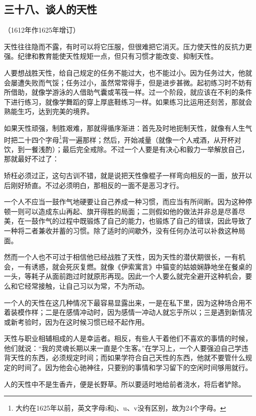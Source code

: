 \subsection*{三十八、谈人的天性}
\begin{center}
    （1612年作1625年增订）
\end{center}
\par 天性往往隐而不露，有时可以将它压服，但很难把它消灭。压力使天性的反抗力更强。纪律和教育能使天性规矩一点，但只有习惯才能改变、抑制天性。
\par 人要想战胜天性，给自己规定的任务不能过大，也不能过小。因为任务过大，他就会屡遭失败而气馁；任务过小，虽然常常得手，但是进步甚微。起初练习时不妨有所借助，就像学游泳的人借助气囊或苇筏一样。过一个阶段，就应该在不利的条件下进行练习，就像学舞蹈的穿上厚底鞋练习一样。如果练习比运用还刻苦，那就会熟能生巧，达到完美的境界。
\par 如果天性顽强，制胜艰难，那就得循序渐进：首先及时地扼制天性，就像有人生气时把二十四个字母\footnote{大约在1625年以前，英文字母i和j、u、v没有区别，故为24个字母。}背一遍那样；然后，开始减量（就像一个人戒酒，从开杯对饮，到一餐浅酌）；最后完全戒除。不过一个人要是有决心和毅力一举解放自己，那就最好不过了：
\par 矫枉必须过正，这句古训不错，就是说把天性像棍子一样弯向相反的一面，放开以后刚好矫直。不过必须明白，那相反的一面不是恶习才行。
\par 一个人不应当一鼓作气地硬要让自己养成一种习惯，而应当有所间断。因为这种停顿一则可以造成东山再起、旗开得胜的局面；二则假如他的做法并非总是尽善尽美，在一鼓作气的过程中既锻炼了自己的能力，也锻炼了自己的错误，因此导致了一种将二者兼收并蓄的习惯。除了适时的间歇外，没有任何办法可以补救这种局面。
\par 然而一个人也不可过于相信他已经战胜了天性，因为天性的潜伏期很长，一有机会，一有诱惑，就会死灰复燃。就像《伊索寓言》中猫变的姑娘娴静地坐在餐桌的一头，等耗子从面前跑过时就原形再现。因此一个人要么就完全避开这种机会，要么和它经常接触，让自己习以为常，不为所动。
\par 一个人的天性在这几种情况下最容易显露出来，一是在私下里，因为这种场合用不着装模作样；二是在感情冲动时，因为感情一冲动人就忘乎所以；三是遇到新情况或新考验时，因为在这时候习惯已经不起作用。
\par 天性与职业相辅相成的人是幸运者。相反，有些人干着他们不喜欢的事情的时候，他们就说：“我的灵魂长期以来一直是个生客。”在学习上，一个人要强迫自己学违背天性的东西，必须规定时间；而如果学符合自己天性的东西，他就不要管什么规定的时间了。因为他会心驰神往，只要别的事情和学习留下的空闲时间够用就行。
\par 人的天性中不是生香卉，便是长野草。所以要适时地给前者浇水，将后者铲除。





